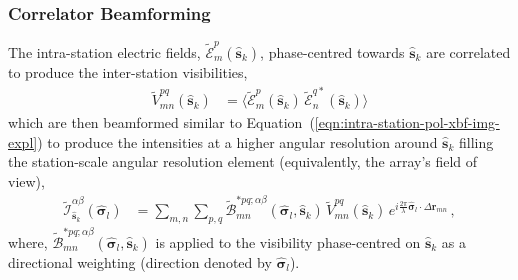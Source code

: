 \documentclass[
  journal=pasa,
  manuscript=article-type,
  year=2020,
  volume=37,
]{cup-journal}
\begin{document}

\subsubsection{Correlator Beamforming}

The intra-station electric fields,
$\widetilde{\mathcal{E}}_m^p(\hat{\boldsymbol{s}}_k)$, phase-centred towards $\hat{\boldsymbol{s}}_k$ are correlated to produce the inter-station visibilities, 
\begin{align}
    \widetilde{V}_{mn}^{pq}(\hat{\boldsymbol{s}}_k) &= \bigl\langle \widetilde{\mathcal{E}}_m^p(\hat{\boldsymbol{s}}_k) \, \widetilde{\mathcal{E}}_n^{q*}(\hat{\boldsymbol{s}}_k)\bigr\rangle \label{eqn:inter-station-pol-visibilities}
\end{align}
which are then beamformed similar to Equation~(\ref{eqn:intra-station-pol-xbf-img-expl}) to produce the intensities at a higher angular resolution around $\hat{\boldsymbol{s}}_k$ filling the station-scale angular resolution element (equivalently, the array's field of view),
\begin{align}
    \widetilde{\mathcal{I}}^{\alpha\beta}_{\hat{\boldsymbol{s}}_k}(\hat{\boldsymbol{\sigma}}_l)
    &= \sum_{m,n} \sum_{p,q} \widetilde{\mathcal{B}}_{mn}^{*pq;\alpha\beta}(\hat{\boldsymbol{\sigma}}_l, \hat{\boldsymbol{s}}_k) \, \widetilde{V}_{mn}^{pq}(\hat{\boldsymbol{s}}_k) \,  e^{i\frac{2\pi}{\lambda} \hat{\boldsymbol{\sigma}}_l\cdot\Delta\boldsymbol{r}_{m n}} \, , \label{eqn:inter-station-pol-xbf-img-expl} 
\end{align}
where, $\widetilde{\mathcal{B}}_{mn}^{*pq;\alpha\beta}(\hat{\boldsymbol{\sigma}}_l,\hat{\boldsymbol{s}}_k)$ is applied to the visibility phase-centred on $\hat{\boldsymbol{s}}_k$ as a directional weighting (direction denoted by $\hat{\boldsymbol{\sigma}}_l$).  
\end{document}
